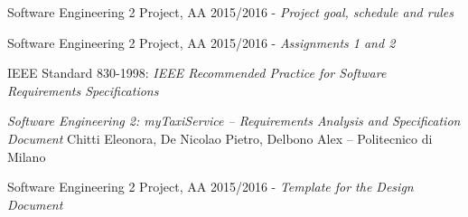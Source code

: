 \begin{thebibliography}{1}
    	Software Engineering 2 Project, AA 2015/2016 - \emph{Project goal, schedule and rules}

    	Software Engineering 2 Project, AA 2015/2016 - \emph{Assignments 1 and 2}

    	IEEE Standard 830-1998: \emph{IEEE Recommended Practice for Software Requirements Specifications}

        \emph{Software Engineering 2: myTaxiService –
        Requirements Analysis and Specification Document}
        Chitti Eleonora, De Nicolao Pietro, Delbono Alex – Politecnico di Milano

        Software Engineering 2 Project, AA 2015/2016 - \emph{Template for the Design Document}
\end{thebibliography}
